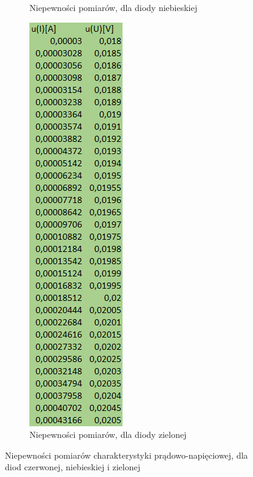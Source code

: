 \documentclass{article}
\begin{document}
\begin{figure}[b!]
\begin{subfigure}[b]{0.2\textwidth}
    \caption{Niepewności pomiarów, dla diody niebieskiej}
  \end{subfigure}
  \begin{subfigure}[b]{0.2\textwidth}
    \includegraphics[width=\linewidth]{Niepewnosci_Dioda_Zielona.png}
    \caption{Niepewności pomiarów, dla diody zielonej\\}
  \end{subfigure}
  \caption{Niepewności pomiarów charakterystyki prądowo-napięciowej, dla diod czerwonej, niebieskiej i zielonej}
\end{figure}
\end{document}
